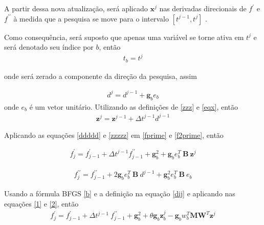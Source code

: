           A partir dessa nova atualização, será aplicado $\mathbf{x}^{j}$ nas derivadas direcionais de $f^{\prime}$ e $f^{\prime \prime}$ à medida que a pesquisa se move para o intervalo $ \left[t^{j-1}, t^{j}\right]$ .
          
          Como consequência, será suposto que apenas uma variável se torne ativa em $t^{j}$ e será denotado seu índice por $b$, então 
          \begin{eqnarray}
           \nonumber
           t_{b}= t^{j}
          \end{eqnarray}

          onde será zerado a componente da direção da pesquisa, assim
          
          \begin{eqnarray}
           d^{j}=d^{j-1}+ \mathbf{g}_{b} e_{b}
           \label{ddddd}
          \end{eqnarray}
          onde $e_{b}$ é um vetor unitário. Utilizando as definições de \ref{zzz} e \ref{eqx}, então
          \begin{eqnarray}
           \mathbf{z}^{j} = \mathbf{z}^{j-1} + \Delta t^{j-1} d^{j-1}
           \label{zzzzz}
          \end{eqnarray}

          Aplicando as equações \ref{ddddd} e \ref{zzzzz} em \ref{fprime} e \ref{f2prime}, então
          
          \begin{eqnarray}
           f^{\prime}_{j} = f^{\prime}_{j-1} + \Delta t^{j-1} f^{\prime \prime}_{j-1} + \mathbf{g}^{2}_{b} + \mathbf{g}_{b} e^{T}_{b}~\mathbf{B}~\mathbf{z}^{j} 
           \label{1}
          \end{eqnarray}
          
          \begin{eqnarray}
          f^{\prime \prime}_{j} = f^{\prime \prime}_{j-1} + 2 \mathbf{g}_{b} e_{b}^{T}~\mathbf{B}~d^{j-1} + \mathbf{g}_{b}^{2} e_{b}^{T}~\mathbf{B}~e_{b} 
          \label{2}
          \end{eqnarray}
          
          Usando a fórmula BFGS \ref{b} e a definição na equação \ref{dij} e aplicando nas equações \ref{1} e \ref{2}, então
          \begin{eqnarray}
          \label{updatefprime}
           f^{\prime}_{j} = f^{\prime}_{j-1} + \Delta t^{j-1}~f^{\prime \prime}_{j-1} + \mathbf{g}_{b}^{2} + \theta \mathbf{g}_{b}\mathbf{z}^{j}_{b} - \mathbf{g}_{b} w_{b}^{T} \mathbf{M} \mathbf{W}^{T} \mathbf{z}^{j}
          \end{eqnarray}

